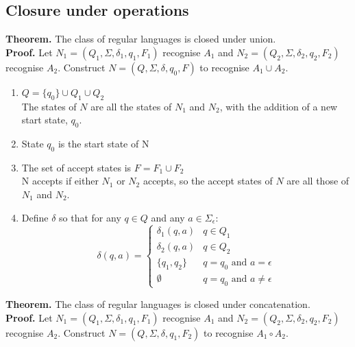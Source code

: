 \documentclass{article}
\begin{document}
\subsection{Closure under operations}
\textbf{Theorem.} The class of regular languages is closed under union.\medskip
\\\textbf{Proof.} Let $N_1 = (Q_1, \Sigma, \delta_1, q_1, F_1)$ recognise $A_1$ and $N_2 = (Q_2, \Sigma, \delta_2, q_2, F_2)$ recognise $A_2$. Construct $N = (Q, \Sigma, \delta, q_0, F)$ to recognise $A_1 \cup A_2$.
\begin{enumerate}
	\item $Q = \{q_0\} \cup Q_1 \cup Q_2$
	\\ The states of $N$ are all the states of $N_1$ and $N_2$, with the addition of a new start state, $q_0$.
	\item State $q_0$ is the start state of N
	\item The set of accept states is $F = F_1 \cup F_2$
	\\ N accepts if either $N_1$ or $N_2$ accepts, so the accept states of $N$ are all those of $N_1$ and $N_2$.
	\item Define $\delta$ so that for any $q \in Q$ and any $a \in \Sigma_{\epsilon}$:
	\begin{equation*}
	\delta(q, a) = \begin{cases}
		\delta_1(q, a) & q \in Q_1\\
		\delta_2(q, a) & q \in Q_2\\
		\{q_1, q_2\} & q = q_0 \text{ and } a = \epsilon\\
		\emptyset & q = q_0 \text{ and } a \neq \epsilon
	\end{cases}
	\end{equation*}
\end{enumerate}
\textbf{Theorem.} The class of regular languages is closed under concatenation.\medskip
\\\textbf{Proof.} Let $N_1 = (Q_1, \Sigma, \delta_1, q_1, F_1)$ recognise $A_1$ and $N_2 = (Q_2, \Sigma, \delta_2, q_2, F_2)$ recognise $A_2$. Construct $N = (Q, \Sigma, \delta, q_1, F_2)$ to recognise $A_1 \circ A_2$.
\end{document}
